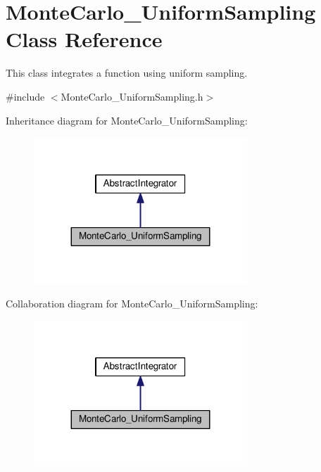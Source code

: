 \hypertarget{class_monte_carlo___uniform_sampling}{}\section{Monte\+Carlo\+\_\+\+Uniform\+Sampling Class Reference}
\label{class_monte_carlo___uniform_sampling}


This class integrates a function using uniform sampling.  




{\ttfamily \#include $<$Monte\+Carlo\+\_\+\+Uniform\+Sampling.\+h$>$}



Inheritance diagram for Monte\+Carlo\+\_\+\+Uniform\+Sampling\+:\nopagebreak
\begin{figure}[H]
\begin{center}
\leavevmode
\includegraphics[width=227pt]{class_monte_carlo___uniform_sampling__inherit__graph}
\end{center}
\end{figure}


Collaboration diagram for Monte\+Carlo\+\_\+\+Uniform\+Sampling\+:\nopagebreak
\begin{figure}[H]
\begin{center}
\leavevmode
\includegraphics[width=227pt]{class_monte_carlo___uniform_sampling__coll__graph}
\end{center}
\end{figure}
